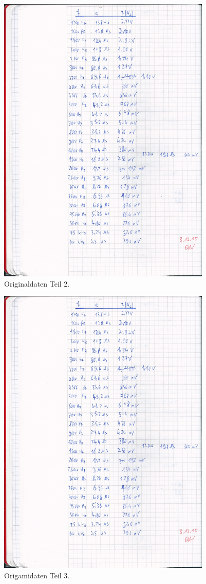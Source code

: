 \begin{figure}[H]
  \centering
  \includegraphics[height=14cm]{original2.png}
  \caption{Originaldaten Teil 2.}
  \label{fig:original2}
\end{figure}

\begin{figure}[H]
  \centering
  \includegraphics[height=14cm]{original2.png}
  \caption{Origamidaten Teil 3.}
  \label{fig:original3}
\end{figure}

\printbibliography



